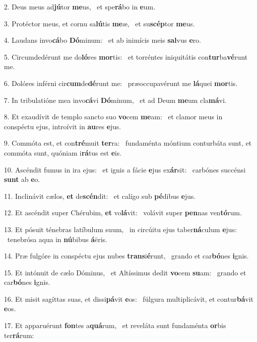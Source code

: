2. Deus meus ad\textbf{jú}tor \textbf{me}us, \ast\  et spe\textbf{rá}bo in \textbf{e}um.\

3. Protéctor meus, et cornu sa\textbf{lú}tis \textbf{me}æ, \ast\  et su\textbf{scép}tor \textbf{me}us.\

4. Laudans invo\textbf{cá}bo \textbf{Dó}minum: \ast\  et ab inimícis meis \textbf{sal}vus \textbf{e}ro.\

5. Circumdedérunt me do\textbf{ló}res \textbf{mor}tis: \ast\  et torréntes iniquitátis con\textbf{tur}ba\textbf{vé}runt me.\

6. Dolóres inférni cir\textbf{cum}de\textbf{dé}runt me: \ast\  præoccupavérunt me \textbf{lá}quei \textbf{mor}tis.\

7. In tribulatióne mea invo\textbf{cá}vi \textbf{Dó}minum, \ast\  et ad Deum \textbf{me}um cla\textbf{má}vi.\

8. Et exaudívit de templo sancto suo \textbf{vo}cem \textbf{me}am: \ast\  et clamor meus in conspéctu ejus, introívit in \textbf{au}res \textbf{e}jus.\

9. Commóta est, et con\textbf{tré}muit \textbf{ter}ra: \ast\  fundaménta móntium conturbáta sunt, et commóta sunt, quóniam i\textbf{rá}tus est \textbf{e}is.\

10. Ascéndit fumus in ira ejus: \dag\  et ignis a fácie \textbf{e}jus ex\textbf{ár}sit: \ast\  carbónes succénsi \textbf{sunt} ab \textbf{e}o.\

11. Inclinávit cælos, \textbf{et} de\textbf{scén}dit: \ast\  et calígo sub \textbf{pé}dibus \textbf{e}jus.\

12. Et ascéndit super Chérubim, \textbf{et} vo\textbf{lá}vit: \ast\  volávit super \textbf{pen}nas ven\textbf{tó}rum.\

13. Et pósuit ténebras latíbulum suum, \dag\  in circúitu ejus taber\textbf{ná}culum \textbf{e}jus: \ast\  tenebrósa aqua in \textbf{nú}bibus \textbf{á}ëris.\

14. Præ fulgóre in conspéctu ejus nubes \textbf{trans}i\textbf{é}runt, \ast\  grando et car\textbf{bó}nes \textbf{i}gnis.\

15. Et intónuit de cælo Dóminus, \dag\  et Altíssimus dedit \textbf{vo}cem \textbf{su}am: \ast\  grando et car\textbf{bó}nes \textbf{i}gnis.\

16. Et misit sagíttas suas, et dissi\textbf{pá}vit \textbf{e}os: \ast\  fúlgura multiplicávit, et contur\textbf{bá}vit \textbf{e}os.\

17. Et apparuérunt \textbf{fon}tes a\textbf{quá}rum, \ast\  et reveláta sunt fundaménta \textbf{or}bis ter\textbf{rá}rum:\

